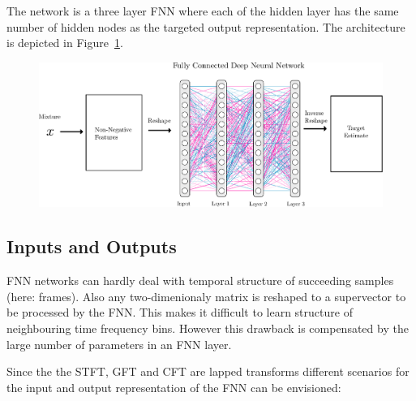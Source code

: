 \par
The network is a three layer FNN where each of the hidden layer has the same number of hidden nodes as the targeted output representation.
The architecture is depicted in Figure~\ref{fig:cft_dnn}.

\begin{figure}[ht!]
\centering
		\includegraphics[width=\textwidth]{Chapters/06_Separation_Unknown/figures/uhlich_dnn.pdf}
\caption{}
\label{fig:cft_dnn}
\end{figure}

\subsection{Inputs and Outputs}

FNN networks can hardly deal with temporal structure of succeeding samples (here: frames).
Also any two-dimenionaly matrix is reshaped to a supervector to be processed by the FNN.
This makes it difficult to learn structure of neighbouring time frequency bins. However this drawback is compensated by the large number of parameters in an FNN layer.

Since the the STFT, GFT and CFT are lapped transforms different scenarios for the input and output representation of the FNN can be envisioned:

